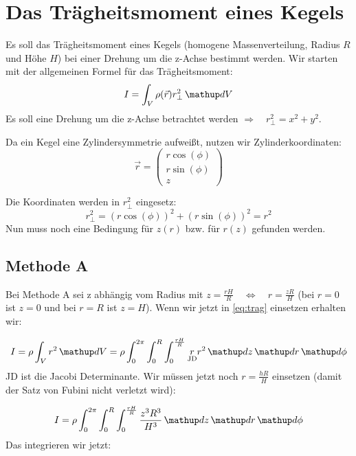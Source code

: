 \section{Das Trägheitsmoment eines Kegels}
Es soll das Trägheitsmoment eines Kegels (homogene Massenverteilung, Radius $R$ und Höhe $H$) bei einer Drehung um die z-Achse bestimmt werden.
Wir starten mit der allgemeinen Formel für das Trägheitsmoment:
\begin{equation}
\label{eq:trag}
I=\int_{V}\rho(\vec{r})r_{\perp}^2\dv{V}
\end{equation}
Es soll eine Drehung um die z-Achse betrachtet werden $\Rightarrow \quad r_{\perp}^2=x^2+y^2$.

Da ein Kegel eine Zylindersymmetrie aufweißt, nutzen wir Zylinderkoordinaten:
\begin{equation*}
\vec{r}=\begin{pmatrix} r\cos(\phi) \\ r\sin(\phi) \\ z \end{pmatrix}
\end{equation*}

Die Koordinaten werden in $r_{\perp}^2$ eingesetz:
\begin{equation*}
r_{\perp}^2=\left(r\cos(\phi)\right)^2+\left(r\sin(\phi)\right)^2=r^2
\end{equation*}
Nun muss noch eine Bedingung für $z(r)$ bzw. für $r(z)$ gefunden werden.

\subsection{Methode A}
Bei Methode A sei z abhängig vom Radius mit $z=\frac{rH}{R} \quad \Leftrightarrow \quad r=\frac{zR}{H}$ (bei $r=0$ ist $z=0$ und bei $r=R$ ist $z=H$). Wenn wir jetzt in \eqref{eq:trag} einsetzen erhalten wir:

\begin{equation*}
I=\rho\int_{V} r^2 \dv{V}=\rho \int_{0}^{2\pi}\int_{0}^{R}\int_{0}^{\frac{rH}{R}} \underset{\text{JD}}{r}r^2\dv{z}\dv{r}\dv{\phi}
\end{equation*}
JD ist die Jacobi Determinante.
Wir müssen jetzt noch $ r=\frac{hR}{H}$ einsetzen (damit der Satz von Fubini nicht verletzt wird):

\begin{equation*}
I=\rho \int_{0}^{2\pi}\int_{0}^{R}\int_{0}^{\frac{rH}{R}} \frac{z^3R^3}{H^3} \dv{z}\dv{r}\dv{\phi}
\end{equation*}
Das integrieren wir jetzt:


